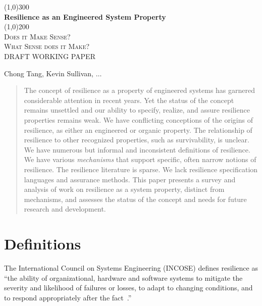 \documentclass[11pt]{article}
\begin{document}
\begin{titlepage}
  \begin{center}
    \line(1,0){300} \\
    [0.25in]
    \huge{\bfseries Resilience as an Engineered System Property} \\
    [2mm]
    \line(1,0){200} \\
    [1.5cm]
    \textsc{\LARGE Does it Make Sense? \\ What Sense does it Make?} \\
    [3cm]
    DRAFT WORKING PAPER \\
    [6.0cm]
  \end{center}
  \begin{flushright}
    Chong Tang, Kevin Sullivan, $\ldots$\\
  \end{flushright}
\end{titlepage}


\begin{abstract}
  The concept of resilience as a property of engineered systems has
  garnered considerable attention in recent years. Yet the status of
  the concept remains unsettled and our ability to specify, realize,
  and assure resilience properties remains weak.  We have conflicting
  conceptions of the origins of resilience, as either an engineered or
  organic property. The relationship of resilience to other recognized
  properties, such as survivability, is unclear. We have numerous but
  informal and inconsistent definitions of resilience. We have various
  {\it mechanisms\/} that support specific, often narrow notions of
  resilience. The resilience literature is sparse. We lack resilience
  specification languages and assurance methods.  This paper presents
  a survey and analysis of work on resilience as a system property,
  distinct from mechanisms, and assesses the status of the concept and
  needs for future research and development.
\end{abstract}


\section{Definitions}

The International Council on Systems Engineering (INCOSE) defines resilience as ``the ability of organizational, hardware and software systems to mitigate the severity and likelihood of failures or losses, to adapt to changing conditions, and to respond appropriately after the fact~\cite{incose}.''
\end{document}

